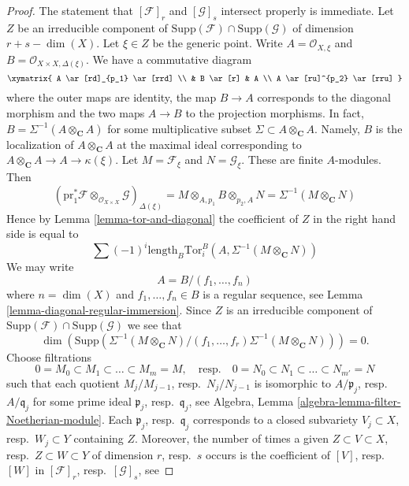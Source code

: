 \begin{proof}
The statement that $[\mathcal{F}]_r$ and $[\mathcal{G}]_s$ intersect properly
is immediate. Let $Z$ be an irreducible component of
$\text{Supp}(\mathcal{F}) \cap \text{Supp}(\mathcal{G})$ of dimension
$r + s - \dim(X)$. Let $\xi \in Z$ be the generic point.
Write $A = \mathcal{O}_{X, \xi}$ and
$B = \mathcal{O}_{X \times X, \Delta(\xi)}$. We have a commutative diagram
$$
\xymatrix{
A \ar[rd]_{p_1} \ar[rrd] \\
& B \ar[r] & A \\
A \ar[ru]^{p_2} \ar[rru]
}
$$
where the outer maps are identity, the map $B \to A$ corresponds to the
diagonal morphism and the two maps $A \to B$ to the projection morphisms.
In fact, $B = \Sigma^{-1}(A \otimes_\mathbf{C} A)$ for some multiplicative
subset $\Sigma \subset A \otimes_\mathbf{C} A$. Namely, $B$ is the
localization of $A \otimes_\mathbf{C} A$ at the maximal ideal corresponding
to $A \otimes_\mathbf{C} A \to A \to \kappa(\xi)$.
Let $M = \mathcal{F}_\xi$ and $N = \mathcal{G}_\xi$.
These are finite $A$-modules. Then
$$
\left(\text{pr}_1^*\mathcal{F}
\otimes_{\mathcal{O}_{X \times X}} \mathcal{G}\right)_{\Delta(\xi)} =
M \otimes_{A, p_1} B \otimes_{p_2, A} N =
\Sigma^{-1}(M \otimes_\mathbf{C} N)
$$
Hence by Lemma \ref{lemma-tor-and-diagonal}
the coefficient of $Z$ in the right hand side is equal to
$$
\sum (-1)^i
\text{length}_B \text{Tor}_i^B(A, \Sigma^{-1}(M \otimes_\mathbf{C} N))
$$
We may write
$$
A = B/(f_1, \ldots, f_n)
$$
where $n = \dim(X)$ and $f_1, \ldots, f_n \in B$ is a regular sequence, see
Lemma \ref{lemma-diagonal-regular-immersion}. Since $Z$ is an irreducible
component of $\text{Supp}(\mathcal{F}) \cap \text{Supp}(\mathcal{G})$
we see that
$$
\dim\left(
\text{Supp}\left(
\Sigma^{-1}(M \otimes_\mathbf{C} N)/
(f_1, \ldots, f_r)\Sigma^{-1}(M \otimes_\mathbf{C} N)
\right)\right)
= 0.
$$
Choose filtrations
$$
0 = M_0 \subset M_1 \subset \ldots \subset M_m = M,
\quad\text{resp.}\quad
0 = N_0 \subset N_1 \subset \ldots \subset N_{m'} = N
$$
such that each quotient $M_j/M_{j - 1}$, resp.\ $N_j/N_{j - 1}$
is isomorphic to $A/\mathfrak p_j$, resp.\ $A/\mathfrak q_j$
for some prime ideal $\mathfrak p_j$, resp.\ $\mathfrak q_j$, see
Algebra, Lemma \ref{algebra-lemma-filter-Noetherian-module}.
Each $\mathfrak p_j$, resp.\ $\mathfrak q_j$ corresponds to a
closed subvariety $V_j \subset X$, resp.\ $W_j \subset Y$
containing $Z$. Moreover, the number of times a given
$Z \subset V \subset X$, resp.\ $Z \subset W \subset Y$
of dimension $r$, resp.\ $s$ occurs is the coefficient of
$[V]$, resp.\ $[W]$ in $[\mathcal{F}]_r$, resp.\ $[\mathcal{G}]_s$, see

\end{proof}
